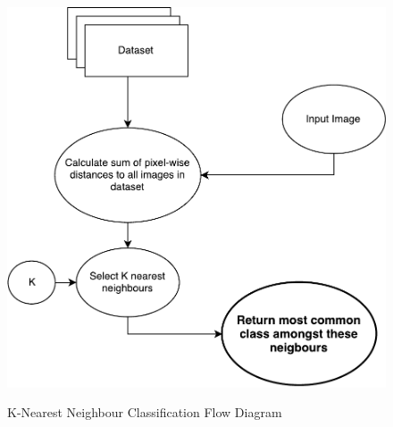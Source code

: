 \begin{figure}
	\centering
	\includegraphics[width=\textwidth]{figures/KNN}
	\label{fig:knn}
	\caption{K-Nearest Neighbour Classification Flow Diagram}
	\centering
\end{figure}

